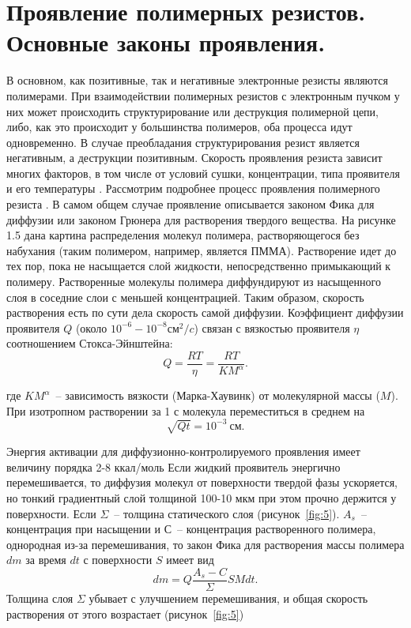 \section{Проявление полимерных резистов. Основные законы проявления.}
В основном, как позитивные, так и негативные электронные резисты являются полимерами. При взаимодействии полимерных резистов с электронным пучком у них может происходить структурирование или деструкция полимерной цепи, либо, как это происходит у большинства полимеров, оба процесса идут одновременно. В случае преобладания структурирования резист является негативным, а деструкции позитивным. Скорость проявления резиста зависит многих факторов, в том числе от условий сушки, концентрации, типа проявителя и его температуры \cite{14}. Рассмотрим подробнее процесс проявления полимерного резиста \cite{15}. В самом общем случае проявление описывается законом Фика для диффузии или законом Грюнера для растворения твердого вещества. На рисунке 1.5 дана картина распределения молекул полимера, растворяющегося без набухания (таким полимером, например, является ПММА). Растворение идет до тех пор, пока не насыщается слой жидкости, непосредственно примыкающий к полимеру. Растворенные молекулы полимера диффундируют из насыщенного слоя в соседние слои с меньшей концентрацией. Таким образом, скорость растворения есть по сути дела скорость самой диффузии.
Коэффициент диффузии проявителя $Q$ (около $10^{-6}-10^{-8} см^2/c$) связан с вязкостью проявителя $\eta$ соотношением Стокса-Эйнштейна:
\begin{equation}
Q=\frac{RT}{\eta}=\frac{RT}{KM^{\alpha}}.
\label{eq:A12}
\end{equation}

где $KM^\alpha$~-- зависимость вязкости (Марка-Хаувинк) от молекулярной массы ($M$). При изотропном растворении за 1 с молекула переместиться в среднем на 
\begin{equation}
\sqrt{Qt}=10^{-3}~\text{см}.
\label{eq:A13}
\end{equation}

Энергия активации для диффузионно-контролируемого проявления имеет величину порядка 2-8 ккал/моль \cite{16}
Если жидкий проявитель энергично перемешивается, то диффузия молекул от поверхности твердой фазы ускоряется, но тонкий градиентный слой толщиной 100-10 мкм при этом прочно держится у поверхности. Если $\Sigma$~-- толщина статического слоя (рисунок~\ref{fig:5}). $A_s$~-- концентрация при насыщении и $С$~-- концентрация растворенного полимера, однородная из-за перемешивания, то закон Фика для растворения массы полимера $dm$ за время $dt$ с поверхности $S$ имеет вид
\begin{equation}
dm=Q\frac{A_s -C}{\Sigma}SMdt.
\label{eq:A14}
\end{equation}
Толщина слоя $\Sigma$ убывает с улучшением перемешивания, и общая скорость растворения от этого возрастает (рисунок~\ref{fig:5})

